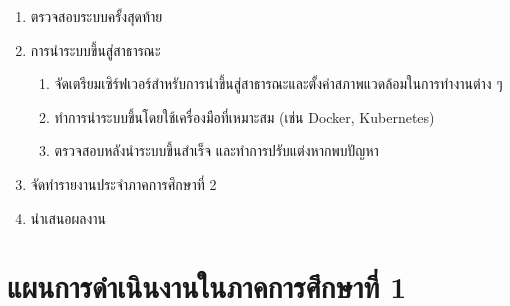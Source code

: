 \documentclass[12pt,oneside,openright,a4paper]{cpe-thai-project}
\begin{document}
\begin{enumerate}
\begin{enumerate}[label=\alph*.]
	\end{enumerate}
\item ตรวจสอบระบบครั้งสุดท้าย
\item การนำระบบขึ้นสู่สาธารณะ
	\begin{enumerate}[label=\alph*.]
	\item จัดเตรียมเซิร์ฟเวอร์สำหรับการนำขึ้นสู่สาธารณะและตั้งค่าสภาพแวดล้อมในการทำงานต่าง ๆ
	\item ทำการนำระบบขึ้นโดยใช้เครื่องมือที่เหมาะสม (เช่น Docker, Kubernetes)
	\item ตรวจสอบหลังนำระบบขึ้นสำเร็จ และทำการปรับแต่งหากพบปัญหา
	\end{enumerate}
\item จัดทํารายงานประจําภาคการศึกษาที่ 2
\item นําเสนอผลงาน
\end{enumerate}

\section{แผนการดําเนินงานในภาคการศึกษาที่ 1}
\end{document}
